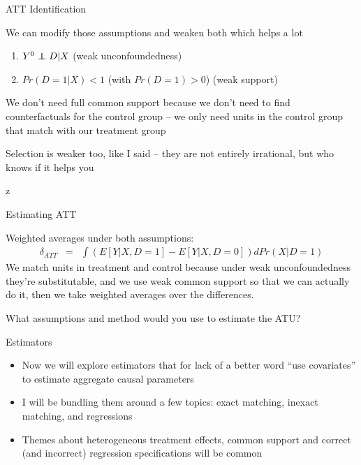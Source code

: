 \documentclass{beamer}
\newcommand\independent{\protect\mathpalette{\protect\independenT}{\perp}}
\def\independenT#1#2{\mathrel{\rlap{$#1#2$}\mkern2mu{#1#2}}}
\begin{document}
\begin{frame}{ATT Identification}

We can modify those assumptions and weaken both which helps a lot

\begin{enumerate}
  \item $Y^0 \independent{D} | X$ (weak unconfoundedness)
  \item $Pr(D=1|X)<1$ (with $Pr(D=1)>0$) (weak support)
\end{enumerate}

\bigskip

We don't need full common support because we don't need to find counterfactuals for the control group -- we only need units in the control group that match with our treatment group

\bigskip

Selection is weaker too, like I said -- they are not entirely irrational, but who knows if it helps you

\end{frame}z



\begin{frame}{Estimating ATT}


Weighted averages under both assumptions:
		\begin{eqnarray*}
		\delta_{ATT} &=& \int \left(E[Y|X,D=1] - E[Y|X,D=0]\right)dPr(X|D=1)
		\end{eqnarray*}
We match units in treatment and control because under weak unconfoundedness they're substitutable, and we use weak common support so that we can actually do it, then we take weighted averages over the differences.  

\bigskip

What assumptions and method would you use to estimate the ATU?
		
\end{frame}



\begin{frame}{Estimators}

\begin{itemize}

\item Now we will explore estimators that for lack of a better word ``use covariates'' to estimate aggregate causal parameters
\item I will be bundling them around a few topics: exact matching, inexact matching, and regressions
\item Themes about heterogeneous treatment effects, common support and correct (and incorrect) regression specifications will be common

\end{itemize}

\end{frame}
\end{document}
